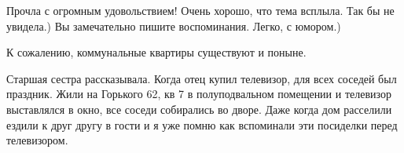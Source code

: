 \begin{itemize}

Прочла с огромным удовольствием! Очень хорошо, что тема всплыла. Так бы не
увидела.) Вы замечательно пишите воспоминания. Легко, с юмором.)

К сожалению, коммунальные квартиры существуют и поныне.


Старшая сестра рассказывала. Когда отец купил телевизор, для всех соседей был
праздник. Жили на Горького 62, кв 7 в полуподвальном помещении и телевизор
выставлялся в окно, все соседи собирались во дворе. Даже когда дом расселили
ездили к друг другу в гости и я уже помню как вспоминали эти посиделки перед
телевизором.



\end{itemize} %
